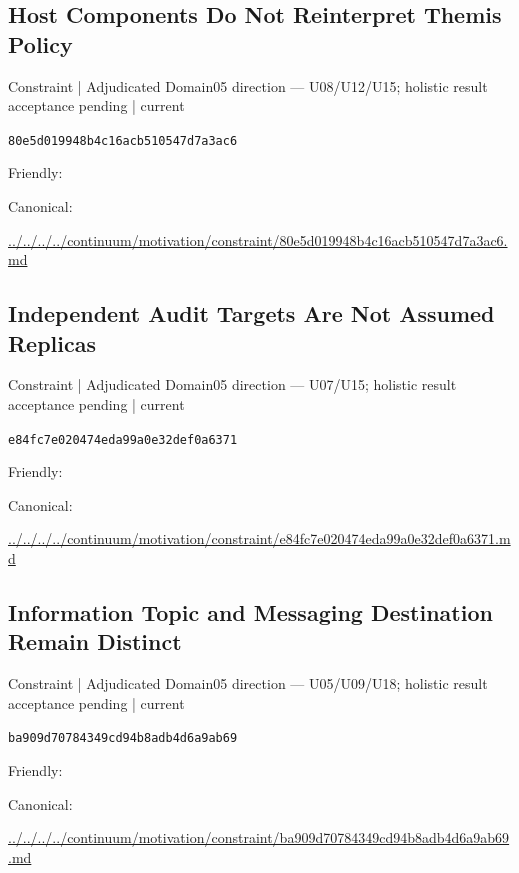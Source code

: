 \documentclass[10pt,a4paper]{article}
\begin{document}
\subsection*{Host Components Do Not Reinterpret Themis Policy}
{\small Constraint | Adjudicated Domain05 direction — U08/U12/U15; holistic result acceptance pending | current}\par
\texttt{80e5d019948b4c16acb510547d7a3ac6}\par
Friendly: \par
Canonical: \par
{\footnotesize\url{../../../../continuum/motivation/constraint/80e5d019948b4c16acb510547d7a3ac6.md}}\par
\subsection*{Independent Audit Targets Are Not Assumed Replicas}
{\small Constraint | Adjudicated Domain05 direction — U07/U15; holistic result acceptance pending | current}\par
\texttt{e84fc7e020474eda99a0e32def0a6371}\par
Friendly: \par
Canonical: \par
{\footnotesize\url{../../../../continuum/motivation/constraint/e84fc7e020474eda99a0e32def0a6371.md}}\par
\subsection*{Information Topic and Messaging Destination Remain Distinct}
{\small Constraint | Adjudicated Domain05 direction — U05/U09/U18; holistic result acceptance pending | current}\par
\texttt{ba909d70784349cd94b8adb4d6a9ab69}\par
Friendly: \par
Canonical: \par
{\footnotesize\url{../../../../continuum/motivation/constraint/ba909d70784349cd94b8adb4d6a9ab69.md}}\par
\end{document}
